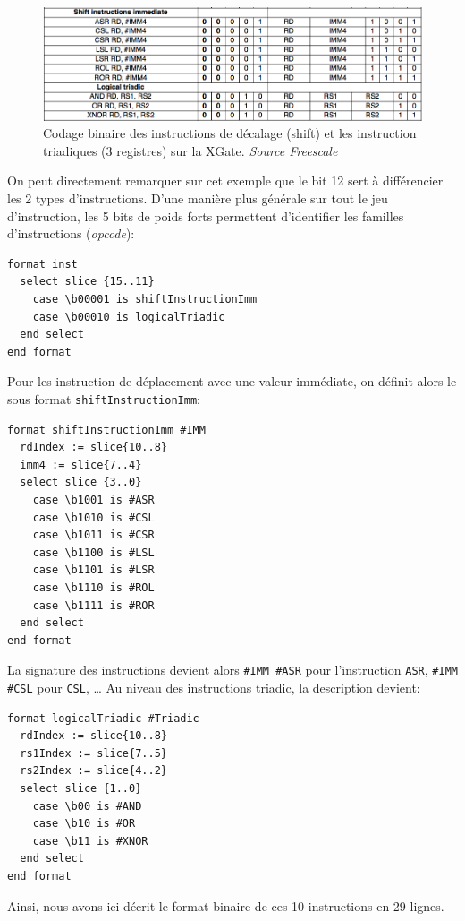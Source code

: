 \begin{figure}[h]		%
  \begin{center}
    \includegraphics[width=0.95 \linewidth]{../common/images/shiftAndTriadicInstFormat.png}
    \caption{Codage binaire des instructions de décalage (shift) et les instruction triadiques (3 registres) sur la XGate. \emph{Source Freescale}}
    \label{fig:shiftAndTriadicInstFormat}
  \end{center}
\end{figure}

On peut directement remarquer sur cet exemple que le bit 12 sert à différencier les 2 types d'instructions. D'une manière plus générale sur tout le jeu d'instruction, les 5 bits de poids forts permettent d'identifier les familles d'instructions (\emph{opcode}):
\begin{lstlisting}
format inst
  select slice {15..11}
    case \b00001 is shiftInstructionImm
    case \b00010 is logicalTriadic
  end select
end format
\end{lstlisting}
Pour les instruction de déplacement avec une valeur immédiate, on définit alors le sous format \texttt{shiftInstructionImm}:
\begin{lstlisting}[firstnumber=7]
format shiftInstructionImm #IMM
  rdIndex := slice{10..8}
  imm4 := slice{7..4}
  select slice {3..0}
    case \b1001 is #ASR
    case \b1010 is #CSL
    case \b1011 is #CSR
    case \b1100 is #LSL
    case \b1101 is #LSR
    case \b1110 is #ROL
    case \b1111 is #ROR
  end select
end format
\end{lstlisting}
La signature des instructions devient alors \texttt{\#IMM \#ASR} pour l'instruction \texttt{ASR}, \texttt{\#IMM \#CSL} pour \texttt{CSL}, \ldots
Au niveau des instructions triadic, la description devient:
\begin{lstlisting}[firstnumber=20]
format logicalTriadic #Triadic
  rdIndex := slice{10..8}
  rs1Index := slice{7..5}
  rs2Index := slice{4..2}
  select slice {1..0}
    case \b00 is #AND
    case \b10 is #OR
    case \b11 is #XNOR
  end select
end format
\end{lstlisting}
Ainsi, nous avons ici décrit le format binaire de ces 10 instructions en 29 lignes.

